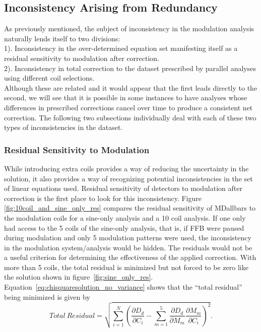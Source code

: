 \subsection{\label{sctn:inconsistency}Inconsistency Arising from Redundancy}
As previously mentioned, the subject of inconsistency in the modulation analysis naturally lends itself to two divisions:\\ 1). Inconsistency in the over-determined equation set manifesting itself as a residual sensitivity to modulation after correction.\\
2). Inconsistency in total correction to the dataset prescribed by parallel analyses using different coil selections.\\ Although these are related and it would appear that the first leads directly to the second, we will see that it is possible in some instances to have analyses whose differences in prescribed corrections cancel over time to produce a consistent net correction. The following two subsections individually deal with each of these two types of inconsistencies in the dataset. 
\subsubsection{Residual Sensitivity to Modulation}
While introducing extra coils provides a way of reducing the uncertainty in the solution, it also provides a way of recognizing potential inconsistencies in the set of linear equations used.  Residual sensitivity of detectors to modulation after correction is the first place to look for this inconsistency. Figure \ref{fig:10coil_and_sine_only_res} compares the residual sensitivity of MDallbars to the modulation coils for a sine-only analysis and a 10 coil analysis. If one only had access to the 5 coils of the sine-only analysis, that is, if FFB were paused during modulation and only 5 modulation patterns were used, the inconsistency in the modulation system/analysis would be hidden. The residuals would not be a useful criterion for determining the effectiveness of the applied correction. With more than 5 coils, the total residual is minimized but not forced to be zero like the solution shown in figure~\ref{fig:sine_only_res}. Equation~\ref{eq:chisquaresolution_no_variance} shows that the ``total residual'' being minimized is given by
\begin{equation}
Total~Residual=\sqrt{\sum_{i=1}^{N}\left(\frac{\partial D_d}{\partial C_i} - \sum_{m=1}^{5}\frac{\partial D_d}{\partial M_m}\frac{\partial M_m}{\partial C_i} \right)^2}.
\label{eq:total_residual}
\end{equation}


